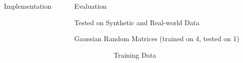 \documentclass[final]{beamer}
\begin{document}
{\begin{frame}{}
\begin{center}
\begin{columns}[t]
\begin{column}{0.32\textwidth}
\begin{block}{\huge Implementation}
    \end{block}


\end{column}

\begin{column}{0.32\textwidth}

       \begin{block}{\huge Evaluation}

\vspace{1cm}
{\Large Tested on Synthetic and Real-world Data}
\begin{itemize}{\Large
\item Gaussian Random Matrices (trained on 4, tested on 1)
\begin{figure}
	\begin{subfigure}[b]{.45\textwidth}
\begin{center}
		\caption{Training Data}
\end{center}
	\end{subfigure}
\hspace{1cm}
	\begin{subfigure}[b]{.45\textwidth}
\begin{center}

\end{center}
\end{subfigure}
\end{figure}}
\end{itemize}
\end{block}
\end{column}
\end{columns}
\end{center}
\end{frame}}
\end{document}
